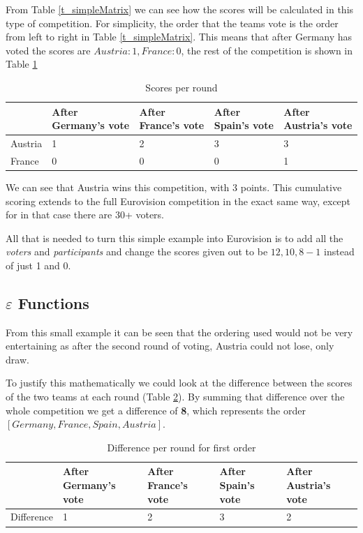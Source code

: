 \documentclass[12pt]{report}
\begin{document}
From Table \ref{t_simpleMatrix} we can see how the scores will be calculated in this type of competition. For simplicity, the order that the teams vote is the order from left to right in Table \ref{t_simpleMatrix}. This means that after Germany has voted the scores are $Austria: 1, France: 0$, the rest of the competition is shown in Table \ref{t_simpleScores}

\begin{table}[H]
\centering
\caption{Scores per round}
\label{t_simpleScores}
\begin{tabular}{|l|l|l|l|l|}
\hline
        & After Germany's vote & After France's vote & After Spain's vote & After Austria's vote \\ \hline
Austria & 1                    & 2                  & 3                   & 3                    \\ \hline
France  & 0                    & 0                  & 0                   & 1                    \\ \hline
\end{tabular}
\end{table}

We can see that Austria wins this competition, with 3 points. This cumulative scoring extends to the full Eurovision competition in the exact same way, except for in that case there are 30+ voters.

All that is needed to turn this simple example into Eurovision is to add all the \textit{voters} and \textit{participants} and change the scores given out to be $12, 10, 8-1$ instead of just 1 and 0.

\subsection{$\varepsilon$ Functions}\label{EntertainmentFunction}
From this small example it can be seen that the ordering used would not be very entertaining as after the second round of voting, Austria could not lose, only draw. 

To justify this mathematically we could look at the difference between the scores of the two teams at each round (Table \ref{t_simpleDifferences}). By summing that difference over the whole competition we get a difference of \textbf{8}, which represents the order $[Germany, France, Spain, Austria]$. 

\begin{table}[H]
\centering
\caption{Difference per round for first order}
\label{t_simpleDifferences}
\begin{tabular}{|l|l|l|l|l|}
\hline
        & After Germany's vote & After France's vote & After Spain's vote & After Austria's vote \\ \hline
Difference & 1                    & 2                  & 3                   & 2                    \\ \hline
\end{tabular}
\end{table}
\end{document}
